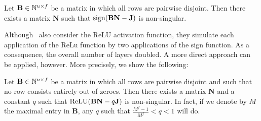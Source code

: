  \begin{lemma}\label{lem:signlemma9}
  Let
  $\mathbf{B}\in \mathbb{N}^{u\times f}$ be a matrix in which all
  rows are pairwise disjoint.
  Then there exists a matrix $\mathbf{N}$ 
  such that $\text{\normalfont sign}(\mathbf{BN}-\mathbf{J})$ is
  non-singular.
\end{lemma}
Although~\cite{grohewl} also consider the ReLU activation function, they simulate each application of the ReLu function by two applications of the sign function. As a consequence,
the overall number of layers doubled. A more direct approach can be applied, however. More
precisely, we show the following:
 \begin{lemma}\label{lem:relulemma9}
  Let
  $\mathbf{B}\in \mathbb{N}^{u\times f}$ be a matrix in which all
  rows are pairwise disjoint and such that no row consists entirely
  out of zeroes.
  Then there exists a matrix $\mathbf{N}$ and a constant $q$
  such that $\text{\normalfont ReLU}(\mathbf{BN}-q\mathbf{J})$ is
  non-singular. In fact, if we denote by $M$ the maximal entry in $\mathbf{B}$,
  any $q$ such that  $\frac{M^f-1}{M^f} < q < 1$ will do.
\end{lemma}
